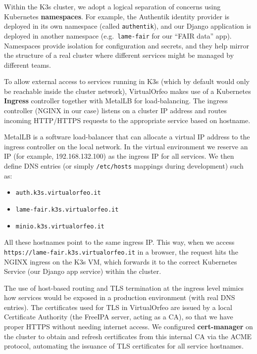 \medskip

Within the K3s cluster, we adopt a logical separation of concerns using 
Kubernetes \textbf{namespaces}. For example, the Authentik identity provider is 
deployed in its own namespace (called \texttt{authentik}), and our Django 
application is deployed in another namespace (e.g.\ \texttt{lame-fair} for our 
``FAIR data'' app). Namespaces provide isolation for configuration and secrets, 
and they help mirror the structure of a real cluster where different services 
might be managed by different teams.

\medskip

To allow external access to services running in K3s (which by default would only 
be reachable inside the cluster network), VirtualOrfeo makes use of a Kubernetes 
\textbf{Ingress} controller together with MetalLB for load-balancing. The ingress 
controller (NGINX in our case) listens on a cluster IP address and routes 
incoming HTTP/HTTPS requests to the appropriate service based on hostname. 

MetalLB is a software load-balancer that can allocate a virtual IP address to 
the ingress controller on the local network. In the virtual environment we 
reserve an IP (for example, 192.168.132.100) as the ingress IP for all services. 
We then define DNS entries (or simply \texttt{/etc/hosts} mappings during 
development) such as:  
\begin{itemize}
	\item \texttt{auth.k3s.virtualorfeo.it}  
	\item \texttt{lame-fair.k3s.virtualorfeo.it}  
	\item \texttt{minio.k3s.virtualorfeo.it}  
\end{itemize}

All these hostnames point to the same ingress IP. This way, when we access 
\texttt{https://lame-fair.k3s.virtualorfeo.it} in a browser, the request hits the 
NGINX ingress on the K3s VM, which forwards it to the correct Kubernetes Service 
(our Django app service) within the cluster. 

The use of host-based routing and TLS termination at the ingress level mimics 
how services would be exposed in a production environment (with real DNS 
entries). The certificates used for TLS in VirtualOrfeo are issued by a local 
Certificate Authority (the FreeIPA server, acting as a CA), so that we have 
proper HTTPS without needing internet access. We configured 
\textbf{cert-manager} on the cluster to obtain and refresh certificates from 
this internal CA via the ACME protocol, automating the issuance of TLS 
certificates for all service hostnames.

